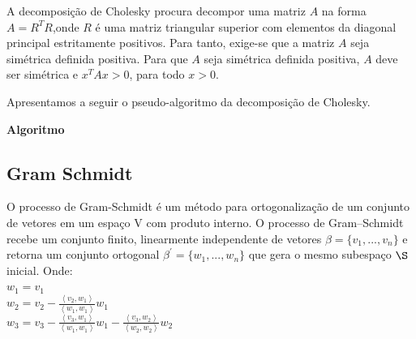 \documentclass[12pt, a4paper]{article}
\begin{document}
A decomposição de Cholesky procura decompor uma matriz $A$ na forma $A = R^{T}R$,onde $R$ é uma matriz triangular superior com elementos da diagonal principal estritamente positivos. Para tanto, exige-se que a matriz $A$ seja simétrica definida positiva. Para que $A$ seja simétrica definida positiva, $A$ deve ser simétrica e $x^{T}Ax > 0$, para todo $x > 0$.

\noindent
Apresentamos a seguir o pseudo-algoritmo da decomposição de Cholesky.


 \begin{algorithm}
   \SetAlgoLined
   
   \label{alg1}
   \caption*{\textbf{Algoritmo}}
 \end{algorithm}

\subsection{Gram Schmidt}

O processo de Gram-Schmidt é um método para ortogonalização de um conjunto de vetores em um espaço V com produto interno. O processo de Gram–Schmidt recebe um conjunto finito, linearmente independente de vetores $\beta = \{v_{1},...,v_{n}\}$ e retorna um conjunto ortogonal $\beta^{'} = \{w_{1},...,w_{n}\}$  que gera o mesmo subespaço $\S$ inicial. Onde:\\


\noindent
$w_{1} = v_{1}$\\
$w_{2} =  v_{2} - \frac{\left \langle v_{2},w_{1} \right \rangle}{\left \langle w_{1},w_{1} \right \rangle}w_{1}$\\ \vspace{2mm}
$w_{3} =  v_{3} - \frac{\left \langle v_{3},w_{1} \right \rangle}{\left \langle w_{1},w_{1} \right \rangle}w_{1} - \frac{\left \langle v_{3},w_{2} \right \rangle}{\left \langle w_{2},w_{2} \right \rangle}w_{2}$
\end{document}
